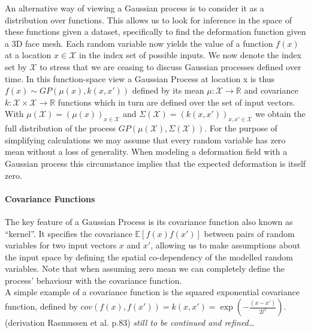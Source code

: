 An alternative way of viewing a Gaussian process is to consider it as a distribution over functions. This allows us to look for inference in the space of these functions given a dataset, specifically to find the deformation function given a 3D face mesh. Each random variable now yields the value of a function $f(x)$ at a location $x \in \mathcal{X}$ in the index set of possible inputs. We now denote the index set by $\mathcal{X}$ to stress that we are ceasing to discuss
Gaussian processes defined over time. In this function-space view a Gaussian Process at location x is thus $f(x) \sim GP(\mu(x), k(x,x'))$ defined by its mean $\mu:\mathcal{X}
\rightarrow \mathbb{R}$ and covariance $k:\mathcal{X} \times \mathcal{X} \rightarrow \mathbb{R}$ functions which in turn are defined over the set of input vectors. With $\mu(\mathcal{X})=(\mu(x))_{x \in \mathcal{X}}$ and $\Sigma(\mathcal{X})=(k(x,x'))_{x,x' \in \mathcal{X}}$ we obtain the full distribution of the process $GP(\mu(\mathcal{X}), \Sigma(\mathcal{X}))$. For the purpose of simplifying calculations we may assume that every random variable has zero mean without a loss of generality. When modeling a deformation field with a Gaussian process this circumstance implies that the expected deformation is itself zero. 

\paragraph{Covariance Functions}
The key feature of a Gaussian Process is its covariance function also known as ``kernel''. It specifies the covariance $\mathbb{E}[f(x)f(x')]$ between pairs of random variables for two input vectors $x$ and $x'$, allowing us to make assumptions about the input space by defining the spatial co-dependency of the modelled random variables. Note that when assuming zero mean we can completely define the process' behaviour with the covariance function.\\
A simple example of a covariance function is the squared exponential covariance function, defined by $cov(f(x),f(x'))=k(x,x')=\exp(-\frac{(x-x')}{2l^{2}})$. (derivation Rasmussen et al. p.83) \textit{still to be continued and refined\ldots}  

